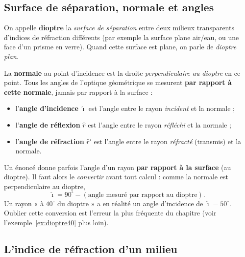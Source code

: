 \documentclass[11pt,a4paper]{article}
\newcommand{\angi}{\hat{\imath}}     %
\newcommand{\angr}{\hat{r}}          %
\begin{document}
\subsection{Surface de séparation, normale et angles}

\begin{definition}[dioptre]
On appelle \textbf{dioptre} la \emph{surface de séparation} entre deux milieux transparents
d'indices de réfraction différents (par exemple la surface plane air/eau, ou une face d'un prisme
en verre). Quand cette surface est plane, on parle de \emph{dioptre plan}.
\end{definition}

\begin{definition}
La \textbf{normale} au point d'incidence est la droite \emph{perpendiculaire au dioptre} en ce point.
Tous les angles de l'optique géométrique se mesurent \textbf{par rapport à cette normale}, jamais par
rapport à la surface :
\begin{itemize}[leftmargin=1.6em,topsep=2pt,itemsep=1pt]
  \item l'\textbf{angle d'incidence} $\angi$ est l'angle entre le rayon \emph{incident} et la normale ;
  \item l'\textbf{angle de réflexion} $\angr$ est l'angle entre le rayon \emph{réfléchi} et la normale ;
  \item l'\textbf{angle de réfraction} $\hat{r}'$ est l'angle entre le rayon \emph{réfracté} (transmis) et la normale.
\end{itemize}
\end{definition}

\begin{attention}
Un énoncé donne parfois l'angle d'un rayon \textbf{par rapport à la surface} (au dioptre).
Il faut alors le \emph{convertir} avant tout calcul : comme la normale est perpendiculaire au dioptre,
\[ \angi = 90^\circ - (\text{angle mesuré par rapport au dioptre}). \]
Un rayon « à $40^\circ$ du dioptre » a en réalité un angle d'incidence de $\angi = 50^\circ$.
Oublier cette conversion est l'erreur la plus fréquente du chapitre (voir l'exemple~\ref{ex:dioptre40} plus loin).
\end{attention}

\subsection{L'indice de réfraction d'un milieu}
\end{document}
